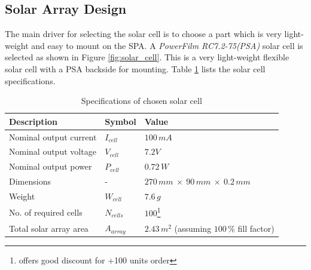 \subsection{Solar Array Design}
\label{sec:SA}
The main driver for selecting the solar cell is to choose a part which is very light-weight and easy to mount on the \ac{SPA}. A  \textit{PowerFilm RC7.2-75(PSA)} solar cell is selected as shown in Figure \ref{fig:solar_cell}. This is a very light-weight flexible solar cell with a \ac{PSA} backside for mounting. Table \ref{tab:solar_cell_spec} lists the solar cell specifications.
%
\begin{table}[H]
\centering
\caption{Specifications of chosen solar cell}
\label{tab:solar_cell_spec}
\begin{minipage}{\textwidth}
\begin{tabular}{p{}p{}p{}}
\hline
\textbf{Description} & \textbf{Symbol} & \textbf{Value}\\
\hline
Nominal output current & $I_{cell}$ & $100\,mA$\\
Nominal output voltage & $V_{cell}$ & $7.2V$\\
Nominal output power & $P_{cell}$ & $0.72\,W$\\
Dimensions & - & $270\,mm\:\times\:90\,mm\:\times\:0.2\,mm$\\
Weight & $W_{cell}$ & $7.6\,g$\\
No. of required cells & $N_{cells}$ & $100$\footnote{\cite{avnetexpress} offers good discount for +100 units order}\\
Total solar array area & $A_{array}$ & $2.43\,m^2$ (assuming $100\,\%$ fill factor)\\
\hline
\end{tabular}\par
\vspace{-0.75\skip\footins}
\renewcommand{\footnoterule}{}
\end{minipage}
\end{table}

